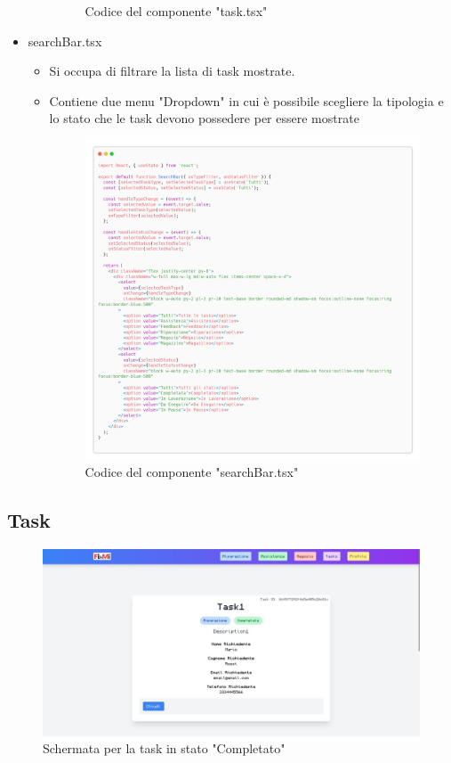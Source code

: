 \documentclass{report}
\begin{document}
\begin{itemize}
\begin{itemize}
\begin{figure}[H]
			Codice del componente "task.tsx"
		\end{figure}
	\end{itemize}
	\item searchBar.tsx
	\begin{itemize}
		\item Si occupa di filtrare la lista di task mostrate.
		\item Contiene due menu "Dropdown" in cui è possibile scegliere la tipologia e lo stato che le task devono possedere per essere mostrate
		\begin{figure}[H]
			\centering\includegraphics[width=1\textwidth]{images/microservizio-task/frontend/searchBar-carbon.png}
			Codice del componente "searchBar.tsx"
		\end{figure}
	\end{itemize}
\end{itemize}

\subsection{Task}

\begin{figure}[H]
	\centering\includegraphics[width=1\textwidth]{images/microservizio-task/frontend/Completata.jpg}
	\caption{Schermata per la task in stato "Completato"}
\end{figure}
\end{document}
